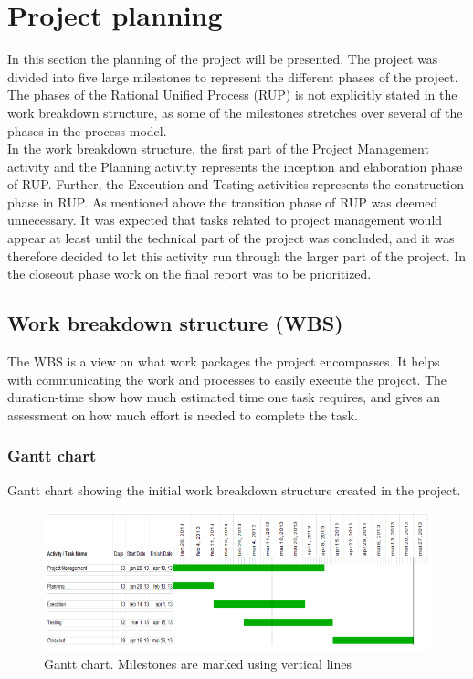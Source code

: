 \section{Project planning}
In this section the planning of the project will be presented. The project was divided into five large milestones to represent the different phases of the project. The phases of the Rational Unified Process (RUP) is not explicitly stated in the work breakdown structure, as some of the milestones stretches over several of the phases in the process model. \\
\newline
In the work breakdown structure, the first part of the Project Management activity and the Planning activity represents the inception and elaboration phase of RUP. Further, the Execution and Testing activities represents the construction phase in RUP. As mentioned above the transition phase of RUP was deemed unnecessary. It was expected that tasks related to project management would appear at least until the technical part of the project was concluded, and it was therefore decided to let this activity run through the larger part of the project. In the closeout phase work on the final report was to be prioritized.

\subsection{Work breakdown structure (WBS)}
The WBS is a view on what work packages the project encompasses. It helps with communicating the work and processes to easily execute the project. The duration-time show how much estimated time one task requires, and gives an assessment on how much effort is needed to complete the task.

\subsubsection{Gantt chart}
Gantt chart showing the initial work breakdown structure created in the project.
\begin{figure}[H]
\includegraphics[scale=0.8]{images/gantt-diagram.png}
\caption{Gantt chart. Milestones are marked using vertical lines}
\end{figure}

